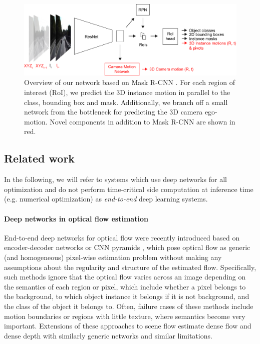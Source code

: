 \begin{figure}[t]
  \centering
  \includegraphics[width=\textwidth]{figures/net_intro}
\caption{
Overview of our network based on Mask R-CNN \cite{MaskRCNN}. For each region of interest (RoI), we predict the 3D instance motion
in parallel to the class, bounding box and mask. Additionally, we branch off a
small network from the bottleneck for predicting the 3D camera ego-motion.
Novel components in addition to Mask R-CNN are shown in red.
}
\label{figure:net_intro}
\end{figure}

\subsection{Related work}

In the following, we will refer to systems which use deep networks for all
optimization and do not perform time-critical side computation
at inference time (e.g. numerical optimization) as \emph{end-to-end} deep learning systems.

\paragraph{Deep networks in optical flow estimation}

End-to-end deep networks for optical flow were recently introduced
based on encoder-decoder networks or CNN pyramids \cite{FlowNet, FlowNet2, SPyNet},
which pose optical flow as generic (and homogeneous) pixel-wise estimation problem without making any assumptions
about the regularity and structure of the estimated flow.
Specifically, such methods ignore that the optical flow varies across an
image depending on the semantics of each region or pixel, which include whether a
pixel belongs to the background, to which object instance it belongs if it is not background,
and the class of the object it belongs to.
Often, failure cases of these methods include motion boundaries or regions with little texture,
where semantics become very important.
Extensions of these approaches to scene flow estimate dense flow and dense depth
with similarly generic networks \cite{SceneFlowDataset} and similar limitations.

